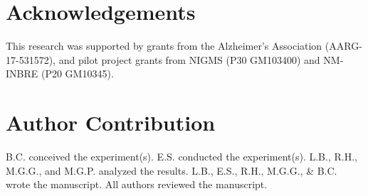 \documentclass[fleqn,10pt]{wlscirep}
\begin{document}




\section*{Acknowledgements}
This research was supported by grants from the Alzheimer’s Association (AARG-17-531572), and pilot project grants from NIGMS (P30 GM103400) and NM-INBRE (P20 GM10345).

\section*{Author Contribution}
B.C. conceived the experiment(s). E.S. conducted the experiment(s). L.B., R.H., M.G.G., and M.G.P. analyzed the results. L.B., E.S., R.H., M.G.G., \& B.C. wrote the manuscript. All authors reviewed the manuscript. 



\end{document}
